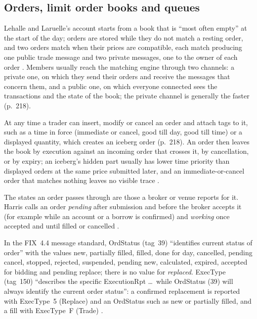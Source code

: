 \subsection{Orders, limit order books and queues}

\begin{qfmechanism}\label{mech:order-lifecycle}
 Lehalle and Laruelle's account starts from a book that is ``most often empty'' at the start of the day; orders are stored while they do not match a resting order, and two orders match when their prices are compatible, each match producing one public trade message and two private messages, one to the owner of each order \citep[chap.~3, sec.~3.3.1, p.~217]{alpha-laruelle}. Members usually reach the matching engine through two channels: a private one, on which they send their orders and receive the messages that concern them, and a public one, on which everyone connected sees the transactions and the state of the book; the private channel is generally the faster (p.~218).

At any time a trader can insert, modify or cancel an order and attach tags to it, such as a time in force (immediate or cancel, good till day, good till time) or a displayed quantity, which creates an iceberg order (p.~218). An order then leaves the book by execution against an incoming order that crosses it, by cancellation, or by expiry; an iceberg's hidden part usually has lower time priority than displayed orders at the same price submitted later, and an immediate-or-cancel order that matches nothing leaves no visible trace \citep[chap.~3, sec.~3.2.2, p.~55]{catalogue-0528}.

The states an order passes through are those a broker or venue reports for it. Harris calls an order \emph{pending} after submission and before the broker accepts it (for example while an account or a borrow is confirmed) and \emph{working} once accepted and until filled or cancelled \citep[chap.~4, sec.~4.2, p.~71]{alpha-harris}.

In the FIX~4.4 message standard, OrdStatus (tag~39) ``identifies current status of order'' with the values new, partially filled, filled, done for day, cancelled, pending cancel, stopped, rejected, suspended, pending new, calculated, expired, accepted for bidding and pending replace; there is no value for \emph{replaced}. ExecType (tag~150) ``describes the specific ExecutionRpt \dots\ while OrdStatus (39) will always identify the current order status'': a confirmed replacement is reported with ExecType~5 (Replace) and an OrdStatus such as new or partially filled, and a fill with ExecType~F (Trade) \citep[OrdStatus and ExecType code sets, FIX.4.4\_EP311]{fix44-orchestra}.


\end{qfmechanism}

